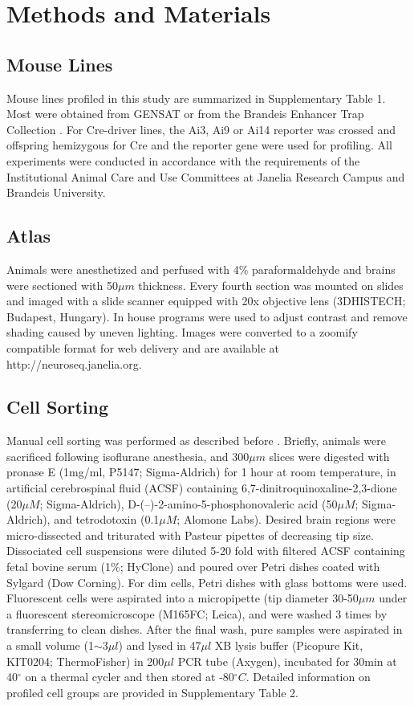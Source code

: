 \section{Methods and Materials}

\subsection{Mouse Lines}
Mouse lines profiled in this study are summarized in Supplementary Table 1. Most were obtained from GENSAT \citep{Gong_2007} or from the Brandeis Enhancer Trap Collection \citep{Shima_2016}. For Cre-driver lines, the Ai3, Ai9 or Ai14 reporter \citep{Madisen_2009} was crossed and offspring hemizygous for Cre and the reporter gene were used for profiling. All experiments were conducted in accordance with the requirements of the Institutional Animal Care and Use Committees at Janelia Research Campus and Brandeis University.

\subsection{Atlas}
Animals were anesthetized and perfused with 4\% paraformaldehyde and brains were sectioned with 50$\mu m$ thickness. Every fourth section was mounted on slides and imaged with a slide scanner equipped with 20x objective lens (3DHISTECH; Budapest, Hungary). In house programs were used to adjust contrast and remove shading caused by uneven lighting. Images were converted to a zoomify compatible format for web delivery and are available at http://neuroseq.janelia.org.

\subsection{Cell Sorting}
Manual cell sorting was performed as described before \citep{Hempel_2007, Sugino_2014}. Briefly, animals were sacrificed following isoflurane anesthesia, and 300$\mu m$ slices were digested with pronase E (1mg/ml, P5147; Sigma-Aldrich) for 1 hour at room temperature, in artificial cerebrospinal fluid (ACSF) containing 6,7-dinitroquinoxaline-2,3-dione (20$\mu M$; Sigma-Aldrich), D-(–)-2-amino-5-phosphonovaleric acid (50$\mu M$; Sigma-Aldrich), and tetrodotoxin (0.1$\mu M$; Alomone Labs). Desired brain regions were micro-dissected and triturated with Pasteur pipettes of decreasing tip size. Dissociated cell suspensions were diluted 5-20 fold with filtered ACSF containing fetal bovine serum (1\%; HyClone) and poured over Petri dishes coated with Sylgard (Dow Corning). For dim cells, Petri dishes with glass bottoms were used. Fluorescent cells were aspirated into a micropipette (tip diameter 30-50$\mu m$ under a fluorescent stereomicroscope (M165FC; Leica), and were washed 3 times by transferring to clean dishes. After the final wash, pure samples were aspirated in a small volume (1$\sim$3$\mu l$) and lysed in 47$\mu l$ XB lysis buffer (Picopure Kit, KIT0204; ThermoFisher) in 200$\mu l$ PCR tube (Axygen), incubated for 30min at 40$^{\circ}$ on a thermal cycler and then stored at -80$^{\circ}C$. Detailed information on profiled cell groups are provided in Supplementary Table 2.

